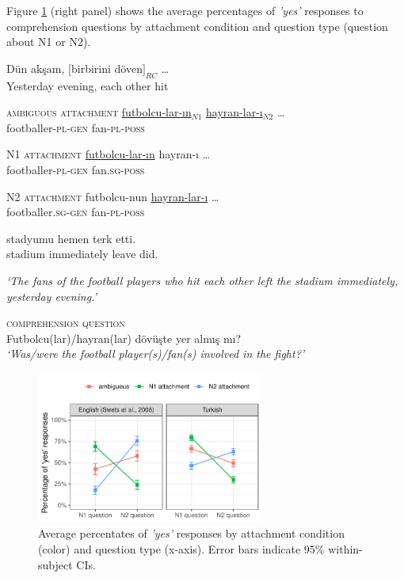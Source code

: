 \documentclass[11pt]{article}\usepackage[]{graphicx}\usepackage[]{color}
\begin{document}
Figure \ref{avg_perc} (right panel) shows the average percentages of \textit{'yes'} responses to comprehension questions by attachment condition and question type (question about N1 or N2).

\begin{exe}
\ex \label{TREx} \gll Dün akşam, $[$birbirini döven$]_{RC}$ \ldots \\
Yesterday evening, {each other} hit  \\
\begin{xlist} 
\item{}\textsc{ambiguous attachment}{} 
\gll \uline{futbolcu-lar-ın}$_{N1}$ \uline{hayran-lar-ı}$_{N2}$ {\ldots} \\
     {footballer}-\textsc{pl}-\textsc{gen} fan-\textsc{pl}-\textsc{poss} {} \\

\item{}\textsc{N1 attachment}{} 
\gll \uline{futbolcu-lar-ın} hayran-ı  {\ldots} \\
    {footballer}-\textsc{pl}-\textsc{gen} fan.\textsc{sg}-\textsc{poss}  {} \\

\item{}\textsc{N2 attachment}{} 
\gll futbolcu-nun \uline{hayran-lar-ı}  {\ldots}\\
    {footballer}.\textsc{sg}-\textsc{gen} fan-\textsc{pl}-\textsc{poss}  {} \\

\item[] \gll {\ldots} stadyumu hemen terk etti. \\
            {}       stadium  immediately leave did. \\
\end{xlist}
\textit{`The fans of the football players who hit each other left the stadium immediately, yesterday evening.'}
\end{exe}

\begin{exe}
\ex \label{TRQuestion}  \textsc{comprehension question} \\ 
 Futbolcu(lar)/hayran(lar) dövüşte yer almış mı? \\
    \textit{`Was/were the football player(s)/fan(s) involved in the fight?'} \\
\end{exe}

\begin{figure}
\includegraphics[width=7.5cm]{../figures/avg_perc.pdf}
\caption{Average percentates of \textit{'yes'} responses by attachment condition (color) and question type (x-axis). Error bars indicate 95\% within-subject CIs.}
\label{avg_perc}
\end{figure}
\end{document}
